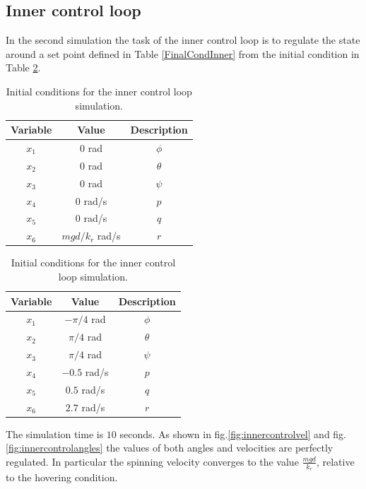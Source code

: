 \documentclass[11pt,a4paper]{scrartcl}
\begin{document}
\subsection*{Inner control loop}

In the second simulation the task of the inner control loop is to regulate the state around a set point defined in Table \ref{FinalCondInner} from the initial condition in Table \ref{InitCondInner}.

\begin{table}
\parbox{.45\linewidth}{
	\begin{tabular}{c c c}
		\toprule
		Variable & Value & Description \\
		\midrule 
		$x_1$  & $0$ rad & $\phi$ \\
		$x_2$  & $0$ rad & $\theta$ \\
		$x_3$  & $0$ rad & $\psi$ \\
		$x_4$  & $0$ rad/s & $p$ \\
		$x_5$  & $0$ rad/s & $q$ \\
		$x_6$  & $mgd/k_r$ rad/s & $r$ \\
		\bottomrule
	\end{tabular}
	\caption{Final set point for the inner control loop simulation.}
	\label{FinalCondInner}
}
\hfill
\parbox{.45\linewidth}{	
	\begin{tabular}{c c c}
		\toprule
		Variable & Value & Description \\
		\midrule 
		$x_1$  & $-\pi/4$ rad & $\phi$ \\
		$x_2$  & $\pi/4$ rad & $\theta$ \\
		$x_3$  & $\pi/4$ rad & $\psi$ \\
		$x_4$  & $-0.5$ rad/s & $p$ \\
		$x_5$  & $0.5$ rad/s & $q$ \\
		$x_6$  & $2.7$ rad/s & $r$ \\
		\bottomrule
	\end{tabular}
	\caption{Initial conditions for the inner control loop simulation.}
	\label{InitCondInner}
}
\end{table}

The simulation time is $ 10 $ seconds. As shown in fig.\ref{fig:innercontrolvel} and fig.\ref{fig:innercontrolangles} the values of both angles and velocities are perfectly regulated. In particular the spinning velocity converges to the value $ \frac{mgd}{k_r} $, relative to the hovering condition.
\end{document}
